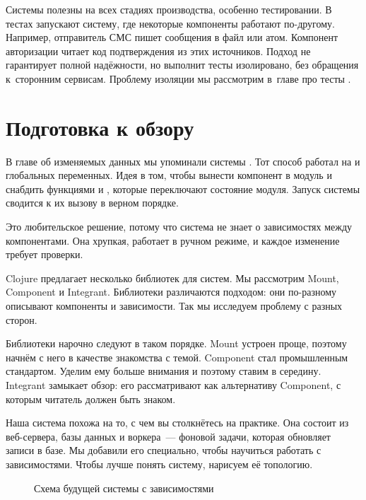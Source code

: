 Системы полезны на всех стадиях производства, особенно тестировании. В тестах
запускают систему, где некоторые компоненты работают по-другому. Например,
отправитель СМС пишет сообщения в файл или атом. Компонент авторизации читает
код подтверждения из этих источников. Подход не гарантирует полной надёжности,
но выполнит тесты изолировано, без обращения к~сторонним сервисам. Проблему
изоляции мы рассмотрим в~главе про тесты .

\section{Подготовка к обзору}


В главе об изменяемых данных мы упоминали системы . Тот
способ работал на  и глобальных переменных. Идея в том,
чтобы вынести компонент в модуль и снабдить функциями  и
, которые переключают состояние модуля. Запуск системы сводится к их
вызову в верном порядке.

Это любительское решение, потому что система не знает о зависимостях между
компонентами. Она хрупкая, работает в ручном режиме, и каждое изменение требует
проверки.

Clojure предлагает несколько библиотек для систем. Мы рассмотрим Mount,
Component и Integrant. Библиотеки различаются подходом: они по-разному описывают
компоненты и зависимости. Так мы исследуем проблему с разных сторон.

Библиотеки нарочно следуют в таком порядке. Mount устроен проще, поэтому начнём
с него в качестве знакомства с темой. Component стал промышленным
стандартом. Уделим ему больше внимания и поэтому ставим в середину. Integrant
замыкает обзор: его рассматривают как альтернативу Component, с которым читатель
должен быть знаком.

Наша система похожа на то, с чем вы столкнётесь на практике. Она состоит из
веб-сервера, базы данных и воркера~--- фоновой задачи, которая обновляет записи
в базе. Мы добавили его специально, чтобы научиться работать с
зависимостями. Чтобы лучше понять систему, нарисуем её топологию\iflarge\else\xspace{}\fi.

\label{demo-system}

\begin{figure}[ht!]
  \caption{Схема будущей системы с зависимостями}
  \label{fig:chart-system}
\end{figure}

